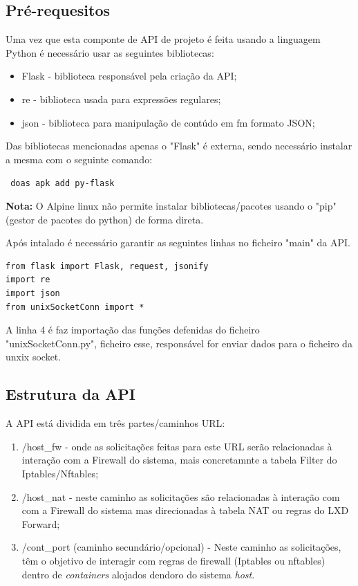 \subsection{Pré-requesitos}

Uma vez que esta componte de API de projeto é feita usando a linguagem Python é necessário
usar as seguintes bibliotecas:

\begin{itemize}
    \item Flask - biblioteca responsável pela criação da API;
    \item re - biblioteca usada para expressões regulares;
    \item json - biblioteca para manipulação de contúdo em fm formato JSON;
\end{itemize}
    
Das bibliotecas mencionadas apenas o "Flask" é externa, sendo necessário instalar a mesma
com o seguinte comando:

\begin{tcolorbox}[colback=blue!5!white,colframe=blue!75!black]
    \verb | doas apk add py-flask |
\end{tcolorbox}

\textbf{Nota:} O Alpine linux não permite instalar bibliotecas/pacotes usando o "pip" (gestor de pacotes
do python) de forma direta.

Após intalado é necessário garantir as seguintes linhas no ficheiro "main" da API.

\begin{lstlisting}[language=csh, caption={Importações necessárias}]
from flask import Flask, request, jsonify
import re
import json
from unixSocketConn import *
\end{lstlisting}

A linha 4 é faz importação das funções defenidas do ficheiro "unixSocketConn.py", ficheiro esse, 
responsável for enviar dados para o ficheiro da unxix socket.


\subsection{Estrutura da API}

A API está dividida em três partes/caminhos URL:

\begin{enumerate}
    \item  \slash host\_fw - onde as solicitações feitas para este URL serão relacionadas à interação
    com a Firewall do sistema, mais concretamnte a tabela Filter do Iptables\slash Nftables;
    \item  \slash host\_nat - neste caminho as solicitações são relacionadas à interação com
    com a Firewall do sistema mas direcionadas à tabela NAT ou regras do LXD Forward;
    \item  \slash cont\_port (caminho secundário/opcional) - Neste caminho as solicitações, têm o objetivo de interagir com regras de firewall
    (Iptables ou nftables) dentro de \textit{containers} alojados dendoro do sistema \textit{host}. 
\end{enumerate}


